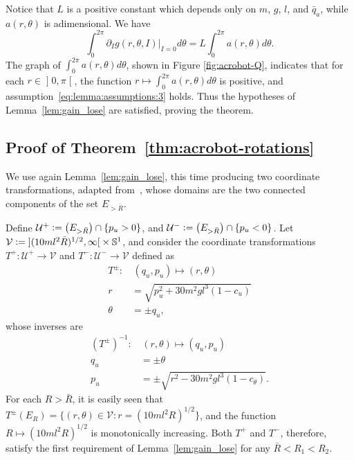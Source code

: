 \documentclass[journal,twoside,web, twocolumn]{ieeecolor}
\newcommand*{\Sone}{\mathbb{S}^1}
\newcommand*{\cU}{\mathcal{U}}
\newcommand*{\cV}{\mathcal{V}}
\newcommand*{\eqdef}{\vcentcolon=}
\begin{document}
%
Notice that \(L\) is a positive constant which depends only on \(m\), \(g\), \(l\), and \(\bar{q}_a\), while \(a(r,\theta)\) is adimensional. We have
\[
\int_0^{2\pi} \partial_I g(r,\theta,I) \big|_{I=0} d \theta =L \int_0^{2\pi} a(r,\theta) d\theta.
\]
The graph of \(\int_0^{2\pi} a(r,\theta) d\theta\), shown in
Figure \ref{fig:acrobot-Q}, indicates that for each $r \in \mathopen] 0,\pi\mathclose[$, the function $r \mapsto \int_0^{2\pi} a(r,\theta) d\theta$ is positive, and assumption~\eqref{eq:lemma:assumptions:3} holds. Thus the hypotheses of Lemma~\ref{lem:gain_lose} are satisfied, proving the theorem.
\hfill\QED


\subsection{Proof of Theorem~\ref{thm:acrobot-rotations}}

We use again Lemma~\ref{lem:gain_lose}, this time producing two coordinate transformations, adapted from~\cite{dynamic_vhcs_stabilize_closed_orbits}, whose domains are the two connected components of the set $E_{>\bar R}$.


Define $\cU^+ \eqdef \big(E_{>\bar R}\big) \cap \{ p_u >0\}$, and $\cU^- \eqdef \big(E_{>\bar R}\big) \cap \{ p_u <0\}$. Let $\cV \eqdef \mathopen] (10 m l^2 \bar R)^{1/2}, \infty \mathclose[ \times \Sone$, and consider the coordinate transformations $T^+ : \cU^+ \to \cV$ and $T^- : \cU^- \to\cV$ defined as
\begin{equation}\label{eq:T2}
\begin{aligned}
T^\pm: & \, (q_u,p_u) \mapsto (r,\theta) \\
%
r &= \sqrt{p_u^2 + 30m^2gl^3(1-c_u)} \\
%
\theta &= \pm q_u,
\end{aligned}
\end{equation}
whose inverses are
\[
\begin{aligned}
(T^\pm)^{-1}: & \, (r,\theta) \mapsto (q_u,p_u)\\
%
q_u &= \pm \theta \\
% 
p_u &= \pm \sqrt{r^2-30m^2gl^3(1-c_\theta)}.
\end{aligned}
\]
For each $R> \bar R$, it is easily seen that $T^\pm(E_R) = \{(r,\theta) \in \cV : r = (10 m l^2 R)^{1/2}\}$, and the function $R \mapsto (10 m l^2 R)^{1/2}$ is monotonically increasing. Both $T^+$ and $T^-$, therefore, satisfy the first requirement of Lemma~\ref{lem:gain_lose} for any $\bar R < R_1 < R_2$. 
\end{document}
